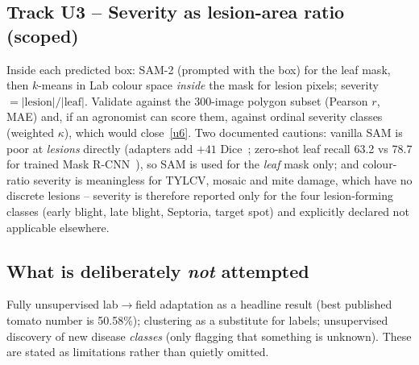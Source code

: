 \subsection{Track U3 -- Severity as lesion-area ratio (scoped)}
Inside each predicted box: SAM-2 (prompted with the box) for the leaf mask, then $k$-means in Lab colour space \emph{inside} the mask for lesion pixels; severity $= |\text{lesion}| / |\text{leaf}|$. Validate against the 300-image polygon subset (Pearson $r$, MAE) and, if an agronomist can score them, against ordinal severity classes (weighted $\kappa$), which would close~\ref{u6}. Two documented cautions: vanilla SAM is poor at \emph{lesions} directly (adapters add $+41$ Dice~\cite{samadapter}; zero-shot leaf recall 63.2 vs 78.7 for trained Mask R-CNN~\cite{leafonlysam}), so SAM is used for the \emph{leaf} mask only; and colour-ratio severity is meaningless for TYLCV, mosaic and mite damage, which have no discrete lesions -- severity is therefore reported only for the four lesion-forming classes (early blight, late blight, Septoria, target spot) and explicitly declared not applicable elsewhere.

\subsection{What is deliberately \emph{not} attempted}
Fully unsupervised lab$\to$field adaptation as a headline result (best published tomato number is 50.58\%); clustering as a substitute for labels; unsupervised discovery of new disease \emph{classes} (only flagging that something is unknown). These are stated as limitations rather than quietly omitted.
